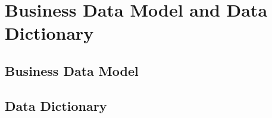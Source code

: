 \chapter{Business Data Model and Data Dictionary}

\section{Business Data Model}

\section{Data Dictionary}